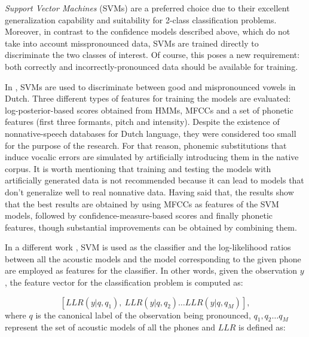 \textit{Support Vector Machines} (SVMs) are a preferred choice 
due to their excellent generalization capability and suitability for 2-class classification
problems. Moreover, in contrast to the confidence models described above, which do not take into
account misspronounced data, SVMs are trained directly to discriminate the two classes of interest.
Of course, this poses a new requirement: both correctly and incorrectly-pronounced data should be
available for training.

In \cite{detection_mispronunciation_dutch_vowel}, SVMs are used to discriminate
between good and mispronounced vowels in Dutch.
Three different types of features for training the models are evaluated: log-posterior-based 
scores obtained from HMMs, MFCCs and a set of 
phonetic features (first three formants, pitch and intensity). Despite the existence of nonnative-speech  
databases for Dutch language, they were considered too small for the purpose of the research. 
For that reason, phonemic 
substitutions that induce vocalic errors are simulated by artificially introducing them in the native corpus. It is worth mentioning that training
and testing the models with artificially generated data is not recommended
because it can lead to models that don't generalize well to real nonnative data.
Having said that, the results show that the best 
results are obtained by using MFCCs as features of the SVM models, followed by confidence-measure-based 
scores and finally phonetic
features, though substantial improvements can be obtained by combining them.

In a different work \cite{svm_space_models}, SVM is used as the classifier and the
log-likelihood ratios between all the acoustic models and the model corresponding to the given
phone are employed as features for the classifier. In other words, given the observation
$y$, the feature vector for the classification problem is computed as: 

\begin{equation}
\label{eq:psm}
[LLR(y|q,q_{1}), \ LLR(y|q,q_{2}) \dotsc LLR(y|q, q_{M})],
\end{equation}
where $q$ is the canonical label of the observation being pronounced, {$q_{1}, q_{2} 
\dotsc q_{M}$} represent the set of acoustic models of all the phones and $LLR$ is defined as:

